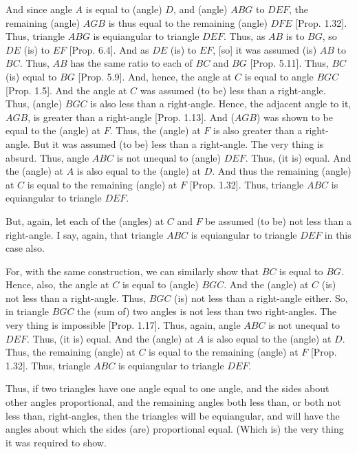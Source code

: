\begin{Parallel}{}{}
{And since angle $A$ is equal to (angle) $D$, and (angle) $ABG$ to $DEF$, the remaining
(angle) $AGB$ is thus equal to the remaining (angle) $DFE$  [Prop. 1.32].
Thus, triangle $ABG$ is equiangular to triangle $DEF$. Thus, as $AB$ is to
$BG$, so $DE$ (is) to $EF$ [Prop. 6.4]. 
And as $DE$ (is) to $EF$, [so] it was assumed (is) $AB$ to $BC$. Thus, $AB$ has the
same ratio to each of $BC$ and $BG$ [Prop. 5.11].
Thus, $BC$ (is) equal to $BG$ [Prop. 5.9].
And, hence, the angle at $C$ is equal to angle $BGC$  [Prop. 1.5].
And the angle at $C$ was assumed (to be) less than a right-angle.
Thus, (angle) $BGC$ is also less than a right-angle. Hence, the adjacent
angle to it, $AGB$, is greater than a right-angle [Prop. 1.13].
And ($AGB$) was shown to be equal to the (angle) at $F$. Thus, the (angle)
at $F$ is also greater than a right-angle. But it was assumed (to be)
less than a right-angle. The very thing is absurd. Thus, angle $ABC$ is
not unequal to (angle) $DEF$. Thus, (it is) equal. And the (angle) at $A$ is also
equal to the (angle) at $D$. And thus the remaining (angle) at $C$ is equal
to the remaining (angle) at $F$  [Prop. 1.32]. Thus, triangle $ABC$
is equiangular to triangle $DEF$.

But, again, let each of the (angles) at $C$ and $F$ be assumed  (to be) not
less than a right-angle. I say, again, that triangle $ABC$
is equiangular to triangle $DEF$ in this case also.

For, with the same construction, we can similarly show that $BC$ is equal to $BG$.
Hence, also, the angle at $C$ is equal to (angle) $BGC$. And  the (angle) at $C$ (is)
not less than a right-angle. Thus, $BGC$ (is) not less than a right-angle
either. So, in triangle $BGC$ the (sum of) two angles is not less than two
right-angles. The very thing is impossible [Prop. 1.17]. Thus, again,
angle $ABC$ is not unequal to $DEF$. Thus, (it is) equal.  And the (angle) at $A$
is also equal to the (angle) at $D$. Thus, the remaining (angle) at $C$ is equal
to the remaining (angle) at $F$ [Prop. 1.32]. Thus, triangle $ABC$ is equiangular to triangle $DEF$.

Thus, if two triangles have one angle equal to one angle,
and the sides about  other angles proportional, and the remaining angles
both less than, or both not less than, right-angles, then the triangles will
be equiangular, and will have the angles about which the sides (are) proportional equal. (Which is) the very thing it was required to show.}
\end{Parallel}

